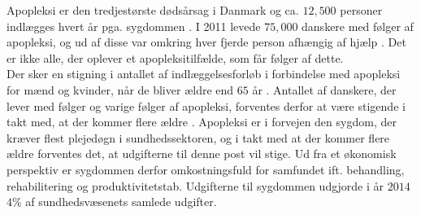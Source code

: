 Apopleksi er den tredjestørste dødsårsag i Danmark og ca. $12,500$ personer indlægges hvert år pga. sygdommen \cite{Hjernesagen2015a}. %
I 2011 levede $75,000$ danskere med følger af apopleksi, og ud af disse var omkring hver fjerde person afhængig af hjælp \cite{Hjernesagen2015a}. Det er ikke alle, der oplever et apopleksitilfælde, som får følger af dette. \\
Der sker en stigning i antallet af indlæggelsesforløb i forbindelse med apopleksi for mænd og kvinder, når de bliver ældre end $65$ år \cite{Sundhedsstyrelsen2011}. Antallet af danskere, der lever med følger og varige følger af apopleksi, forventes derfor at være stigende i takt med, at der kommer flere ældre \cite{Sagen2014}. Apopleksi er i forvejen den sygdom, der kræver flest plejedøgn i sundhedssektoren, og i takt med at der kommer flere ældre forventes det, at udgifterne til denne post vil stige. Ud fra et økonomisk perspektiv er sygdommen derfor omkostningsfuld for samfundet ift. behandling, rehabilitering og produktivitetstab.  Udgifterne til sygdommen udgjorde i år $2014$ $4\%$ af sundhedsvæsenets samlede udgifter. \cite{Hjernesagen2015a, Kruuse2014}
 
